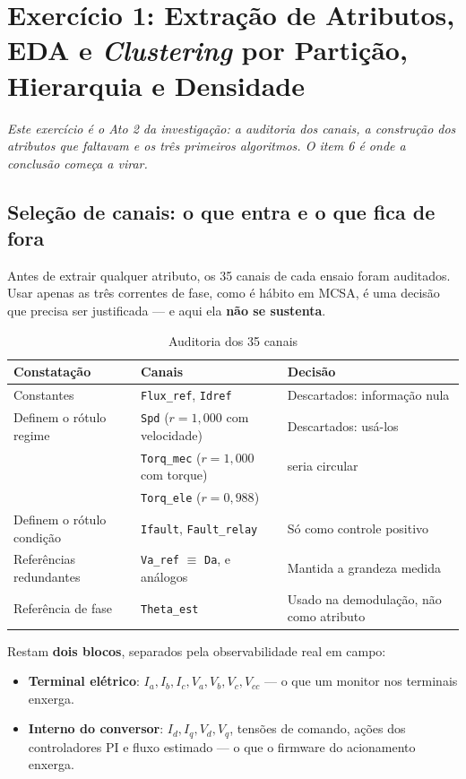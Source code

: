 \documentclass[12pt,a4paper]{article}
\begin{document}
\newpage
\section{Exercício 1: Extração de Atributos, EDA e \emph{Clustering} por Partição, Hierarquia e Densidade}

\noindent\emph{Este exercício é o Ato 2 da investigação: a auditoria dos canais, a construção dos atributos que faltavam e os três primeiros algoritmos. O item 6 é onde a conclusão começa a virar.}

\subsection{Seleção de canais: o que entra e o que fica de fora}

Antes de extrair qualquer atributo, os 35 canais de cada ensaio foram auditados. Usar apenas as três correntes de fase, como é hábito em MCSA, é uma decisão que precisa ser justificada --- e aqui ela \textbf{não se sustenta}.

\begin{table}[H]
\centering
\caption{Auditoria dos 35 canais}
\begin{tabular}{lll}
\toprule
Constatação & Canais & Decisão \\
\midrule
Constantes & \texttt{Flux\_ref}, \texttt{Idref} & Descartados: informação nula \\
Definem o rótulo regime & \texttt{Spd} ($r = 1{,}000$ com velocidade) & Descartados: usá-los \\
                        & \texttt{Torq\_mec} ($r = 1{,}000$ com torque) & seria circular \\
                        & \texttt{Torq\_ele} ($r = 0{,}988$) & \\
Definem o rótulo condição & \texttt{Ifault}, \texttt{Fault\_relay} & Só como controle positivo \\
Referências redundantes & \texttt{Va\_ref} $\equiv$ \texttt{Da}, e análogos & Mantida a grandeza medida \\
Referência de fase & \texttt{Theta\_est} & Usado na demodulação, não como atributo \\
\bottomrule
\end{tabular}
\end{table}

\noindent Restam \textbf{dois blocos}, separados pela observabilidade real em campo:
\begin{itemize}[nosep]
    \item \textbf{Terminal elétrico}: $I_a, I_b, I_c, V_a, V_b, V_c, V_{cc}$ --- o que um monitor nos terminais enxerga.
    \item \textbf{Interno do conversor}: $I_d, I_q, V_d, V_q$, tensões de comando, ações dos controladores PI e fluxo estimado --- o que o firmware do acionamento enxerga.
\end{itemize}
\end{document}
